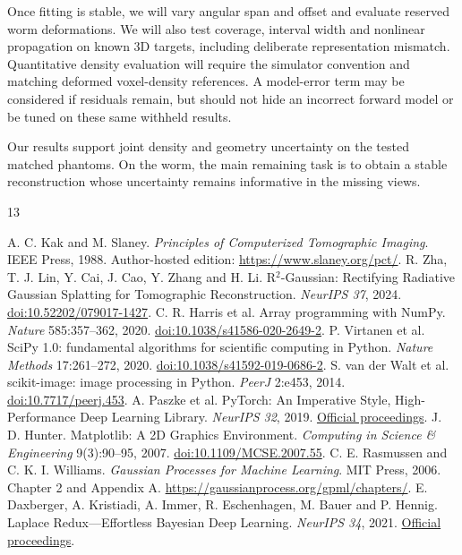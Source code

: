 \documentclass[11pt,a4paper]{article}
\begin{document}
Once fitting is stable, we will vary angular span and offset and evaluate reserved worm deformations. We will also test coverage, interval width and nonlinear propagation on known 3D targets, including deliberate representation mismatch. Quantitative density evaluation will require the simulator convention and matching deformed voxel-density references. A model-error term may be considered if residuals remain, but should not hide an incorrect forward model or be tuned on these same withheld results.

Our results support joint density and geometry uncertainty on the tested matched phantoms. On the worm, the main remaining task is to obtain a stable reconstruction whose uncertainty remains informative in the missing views.

\begin{thebibliography}{13}\small\raggedright
{} A. C. Kak and M. Slaney. \emph{Principles of Computerized Tomographic Imaging}. IEEE Press, 1988. Author-hosted edition: \url{https://www.slaney.org/pct/}.
 R. Zha, T. J. Lin, Y. Cai, J. Cao, Y. Zhang and H. Li. R$^2$-Gaussian: Rectifying Radiative Gaussian Splatting for Tomographic Reconstruction. \emph{NeurIPS 37}, 2024. \href{https://doi.org/10.52202/079017-1427}{doi:10.52202/079017-1427}.
 C. R. Harris et al. Array programming with NumPy. \emph{Nature} 585:357--362, 2020. \href{https://doi.org/10.1038/s41586-020-2649-2}{doi:10.1038/s41586-020-2649-2}.
 P. Virtanen et al. SciPy 1.0: fundamental algorithms for scientific computing in Python. \emph{Nature Methods} 17:261--272, 2020. \href{https://doi.org/10.1038/s41592-019-0686-2}{doi:10.1038/s41592-019-0686-2}.
 S. van der Walt et al. scikit-image: image processing in Python. \emph{PeerJ} 2:e453, 2014. \href{https://doi.org/10.7717/peerj.453}{doi:10.7717/peerj.453}.
 A. Paszke et al. PyTorch: An Imperative Style, High-Performance Deep Learning Library. \emph{NeurIPS 32}, 2019. \href{https://proceedings.neurips.cc/paper/2019/hash/bdbca288fee7f92f2bfa9f7012727740-Abstract.html}{Official proceedings}.
 J. D. Hunter. Matplotlib: A 2D Graphics Environment. \emph{Computing in Science \& Engineering} 9(3):90--95, 2007. \href{https://doi.org/10.1109/MCSE.2007.55}{doi:10.1109/MCSE.2007.55}.
 C. E. Rasmussen and C. K. I. Williams. \emph{Gaussian Processes for Machine Learning}. MIT Press, 2006. Chapter 2 and Appendix A. \url{https://gaussianprocess.org/gpml/chapters/}.
 E. Daxberger, A. Kristiadi, A. Immer, R. Eschenhagen, M. Bauer and P. Hennig. Laplace Redux---Effortless Bayesian Deep Learning. \emph{NeurIPS 34}, 2021. \href{https://proceedings.neurips.cc/paper_files/paper/2021/hash/a7c9585703d275249f30a088cebba0ad-Abstract.html}{Official proceedings}.

\end{thebibliography}
\end{document}

